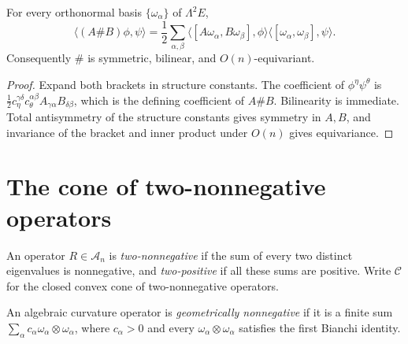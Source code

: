 \begin{lemma}
  \label{lem:chow-ii-sharp-product-intrinsic-formula}
  For every orthonormal basis \(\{\omega_\alpha\}\) of \(\Lambda^2E\),
  \[
  \langle(A\#B)\phi,\psi\rangle
  =\frac12\sum_{\alpha,\beta}
    \langle[A\omega_\alpha,B\omega_\beta],\phi\rangle
    \langle[\omega_\alpha,\omega_\beta],\psi\rangle .
  \]
  Consequently \(\#\) is symmetric, bilinear, and \(O(n)\)-equivariant.
\end{lemma}
\begin{proof}
  Expand both brackets in structure constants.  The coefficient of
  \(\phi^\eta\psi^\theta\) is
  \(\tfrac12c_\eta^{\gamma\delta}c_\theta^{\alpha\beta}
  A_{\gamma\alpha}B_{\delta\beta}\), which is the defining coefficient of
  \(A\#B\).  Bilinearity is immediate.  Total antisymmetry of the structure
  constants gives symmetry in \(A,B\), and invariance of the bracket and
  inner product under \(O(n)\) gives equivariance.
\end{proof}

\section{The cone of two-nonnegative operators}

\begin{definition}
  \label{def:chow-ii-two-nonnegative-algebraic-curvature}
  An operator \(R\in\mathcal A_n\) is \emph{two-nonnegative} if the sum of
  every two distinct eigenvalues is nonnegative, and \emph{two-positive} if
  all these sums are positive.  Write \(\mathcal C\) for the closed convex
  cone of two-nonnegative operators.
\end{definition}

\begin{definition}
  \label{def:chow-ii-geometrically-nonnegative-curvature}
  An algebraic curvature operator is \emph{geometrically nonnegative} if it
  is a finite sum \(\sum_\alpha c_\alpha\omega_\alpha\otimes\omega_\alpha\),
  where \(c_\alpha>0\) and every
  \(\omega_\alpha\otimes\omega_\alpha\) satisfies the first Bianchi identity.
\end{definition}

